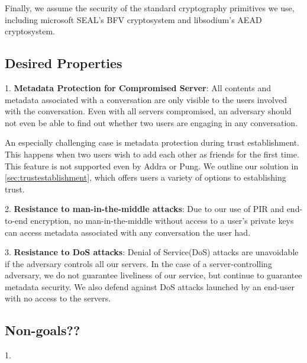 Finally, we assume the security of the standard cryptography primitives we use, including microsoft SEAL's BFV cryptosystem and libsodium's AEAD cryptosystem. 

\subsection{Desired Properties}

1. \textbf{Metadata Protection for Compromised Server}: All contents and metadata associated with a conversation are only visible to the users involved with the conversation. Even with all servers compromised, an adversary should not even be able to find out whether two users are engaging in any conversation.

An especially challenging case is metadata protection during trust establishment. This happens when two users wish to add each other as friends for the first time. This feature is not supported even by Addra or Pung. We outline our solution in \cref{sec:trustestablishment}, which offers users a variety of options to establishing trust.

2. \textbf{Resistance to man-in-the-middle attacks}: Due to our use of PIR and end-to-end encryption, no man-in-the-middle without access to a user's private keys can access metadata associated with any conversation the user had.

3. \textbf{Resistance to DoS attacks}: Denial of Service(DoS) attacks are unavoidable if the adversary controls all our servers. In the case of a server-controlling adversary, we do not guarantee liveliness of our service, but continue to guarantee metadata security. We also defend against DoS attacks launched by an end-user with no access to the servers.

\subsection{Non-goals??}
1. 


